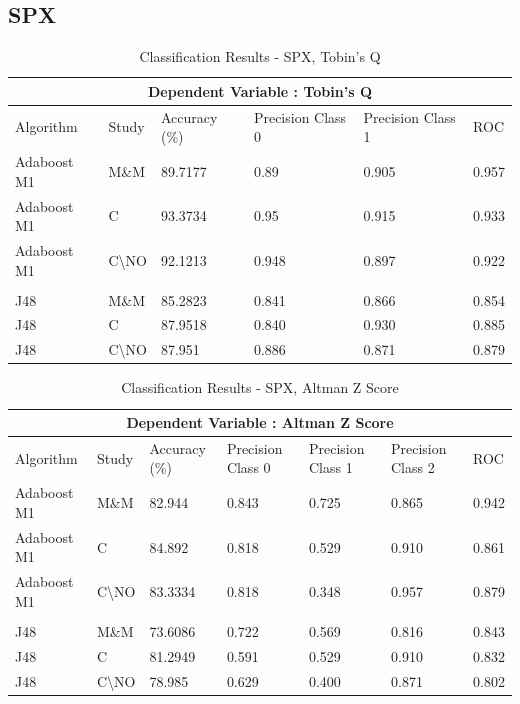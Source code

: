 \subsection*{SPX}
\cite{moldovan2015learning}
\begin{table}[h!]
\centering
\begin{tabular}{ |p{2.5cm}|p{2cm}||p{2.5cm}|p{2cm}|p{2cm}|p{1cm}|  }
 \hline
 \multicolumn{6}{|c|}{Dependent Variable : Tobin's Q} \\
 \hline
 Algorithm & Study & Accuracy (\%) & Precision Class 0 & Precision Class 1 & ROC \\
 \hline
 Adaboost M1 & M\&M &  89.7177 & 0.89 &  0.905 & 0.957  \\
 Adaboost M1 & C & 93.3734  & 0.95 & 0.915  &  0.933 \\
  Adaboost M1 & C\textbackslash NO & 92.1213  & 0.948 & 0.897 &  0.922 \\
 & & & & & \\
 J48  & M\&M & 85.2823  & 0.841 &  0.866 & 0.854  \\
 J48  & C & 87.9518  & 0.840 & 0.930  & 0.885  \\
 J48 & C\textbackslash NO & 87.951  & 0.886 & 0.871  & 0.879  \\
 \hline
\end{tabular}
\caption{Classification Results - SPX, Tobin's Q}
\end{table}


\begin{table}[h]
\begin{tabular}{ |p{2.5cm}|p{1.5cm}||p{2.5cm}|p{1.6cm}|p{1.6cm}|p{1.6cm}|p{1cm}|  }
 \hline
 \multicolumn{7}{|c|}{Dependent Variable : Altman Z Score} \\
 \hline
 Algorithm & Study & Accuracy (\%) & Precision Class 0 & Precision Class 1 & Precision Class 2 & ROC \\
 \hline
 Adaboost M1 & M\&M  &  82.944     & 0.843 &  0.725 & 0.865 & 0.942  \\
 Adaboost M1 & C & 84.892 & 0.818 & 0.529  & 0.910  & 0.861  \\
  Adaboost M1 & C\textbackslash NO & 83.3334 & 0.818 & 0.348  & 0.957 & 0.879  \\
  & & & & & &\\
 J48  & M\&M & 73.6086  & 0.722 &  0.569 & 0.816 & 0.843  \\
 J48 & C & 81.2949 & 0.591 & 0.529 & 0.910  &  0.832 \\
 J48 & C\textbackslash NO & 78.985 & 0.629 & 0.400  & 0.871 &  0.802 \\
 \hline
\end{tabular}
\caption{Classification Results  - SPX, Altman Z Score}
\end{table}







